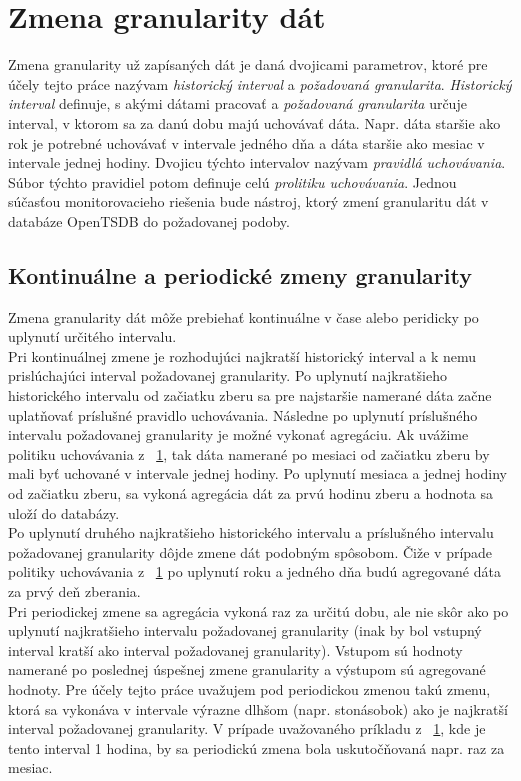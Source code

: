 \documentclass[printed,11pt,twoside,color,cover,table]{fithesis3}
\begin{document}
\section{Zmena granularity dát}
\label{sec:policy}
Zmena granularity už zapísaných dát je daná dvojicami parametrov, ktoré pre účely tejto práce nazývam
\textit{historický interval} a \textit{požadovaná granularita}. \textit{Historický interval} definuje, s akými dátami pracovať a \textit{požadovaná granularita} určuje
interval, v ktorom sa za danú dobu majú uchovávať dáta. Napr. dáta staršie ako rok je potrebné uchovávať v intervale jedného dňa a 
dáta staršie ako mesiac v intervale jednej hodiny. Dvojicu týchto intervalov nazývam \textit{pravidlá uchovávania}. Súbor týchto pravidiel potom definuje celú \textit{prolitiku uchovávania}.
Jednou súčasťou monitorovacieho riešenia bude nástroj, ktorý zmení granularitu dát v databáze OpenTSDB do požadovanej podoby.

\subsection{Kontinuálne a periodické zmeny granularity}
Zmena granularity dát môže prebiehať kontinuálne v čase alebo peridicky po uplynutí určitého intervalu. 
\\Pri kontinuálnej zmene je rozhodujúci najkratší historický interval a k nemu prislúchajúci interval požadovanej granularity. Po uplynutí najkratšieho historického intervalu od začiatku zberu sa pre 
najstaršie namerané dáta začne uplatňovať príslušné pravidlo uchovávania. Následne po uplynutí príslušného intervalu požadovanej granularity je možné vykonať agregáciu. 
Ak uvážime politiku uchovávania z ~\ref{sec:policy}, tak dáta namerané po mesiaci od začiatku zberu by mali byť uchované v intervale jednej hodiny. Po uplynutí mesiaca a jednej hodiny od začiatku zberu,
sa vykoná agregácia dát za prvú hodinu zberu a hodnota sa uloží do databázy.
\\Po uplynutí druhého najkratšieho historického intervalu a príslušného intervalu požadovanej granularity dôjde zmene dát podobným spôsobom. Čiže v prípade politiky uchovávania z ~\ref{sec:policy} po uplynutí
roku a jedného dňa budú agregované dáta za prvý deň zberania.
\\Pri periodickej zmene sa agregácia vykoná raz za určitú dobu, ale nie skôr ako po uplynutí najkratšieho intervalu požadovanej granularity
(inak by bol vstupný interval kratší ako interval požadovanej granularity). Vstupom sú hodnoty namerané po poslednej úspešnej zmene granularity a výstupom sú agregované hodnoty. Pre účely tejto práce
uvažujem pod periodickou zmenou takú zmenu, ktorá sa vykonáva v intervale výrazne dlhšom (napr. stonásobok) ako je najkratší interval požadovanej granularity. V prípade uvažovaného príkladu z ~\ref{sec:policy}, kde je 
tento interval 1 hodina, by sa periodickú zmena bola uskutočňovaná napr. raz za mesiac.
\end{document}
